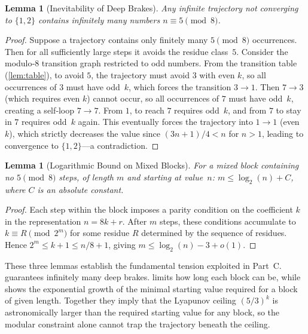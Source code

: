 \documentclass[12pt,a4paper]{article}
\newtheorem{lemma}[theorem]{Lemma}
\theoremstyle{definition}
\theoremstyle{remark}
\begin{document}
\begin{lemma}[Inevitability of Deep Brakes]\label{lem:inevitable}
Any infinite trajectory not converging to $\{1,2\}$ contains infinitely
many numbers $n\equiv5\pmod8$.
\end{lemma}

\begin{proof}
Suppose a trajectory contains only finitely many $5\pmod8$ occurrences.
Then for all sufficiently large steps it avoids the residue class~$5$.
Consider the modulo‑$8$ transition graph restricted to odd numbers.
From the transition table (\cref{lem:table}), to avoid $5$, the
trajectory must avoid $3$ with even $k$, so all occurrences of $3$
must have odd~$k$, which forces the transition $3\to1$.
Then $7\to3$ (which requires even $k$) cannot occur, so all occurrences
of $7$ must have odd~$k$, creating a self‑loop $7\to7$.
From $1$, to reach $7$ requires odd~$k$, and from $7$ to stay in $7$
requires odd~$k$ again.
This eventually forces the trajectory into $1\to1$ (even $k$), which
strictly decreases the value since $(3n+1)/4<n$ for $n>1$, leading to
convergence to $\{1,2\}$---a contradiction.
\end{proof}

\begin{lemma}[Logarithmic Bound on Mixed Blocks]\label{lem:logbound}
For a mixed block containing no $5\pmod8$ steps, of length $m$ and
starting at value~$n$:
$m\le\log_2(n)+C$, where $C$ is an absolute constant.
\end{lemma}

\begin{proof}
Each step within the block imposes a parity condition on the coefficient
$k$ in the representation $n=8k+r$.
After $m$ steps, these conditions accumulate to
$k\equiv R\pmod{2^m}$ for some residue $R$ determined by the sequence
of residues.
Hence $2^m\le k+1\le n/8+1$, giving $m\le\log_2(n)-3+o(1)$.
\end{proof}

These three lemmas establish the fundamental tension exploited in
Part~C.
 guarantees infinitely many deep brakes.
 limits how long each block can be, while
 shows the exponential growth of the minimal starting
value required for a block of given length.
Together they imply that the Lyapunov ceiling $(5/3)^k$ is
astronomically larger than the required starting value for any block,
so the modular constraint alone cannot trap the trajectory beneath the
ceiling.
\end{document}
